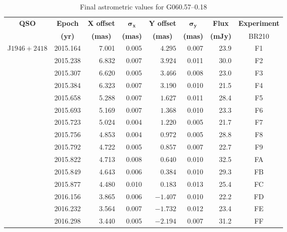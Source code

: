 	\begin{table}[h]
		\onehalfspacing
		\footnotesize
		\centering
		\caption{Final astrometric values for G060.57--0.18}
		\label{tab:g060_position}
		\begin{tabular}{lrrrrrrc} \toprule
			\multicolumn{1}{c}{\bf QSO}&\multicolumn{1}{c}{\bf Epoch} & \multicolumn{1}{c}{\bf X offset} & \multicolumn{1}{c}{$\boldsymbol{\sigma_x}$} & \multicolumn{1}{c}{\bf Y offset} & \multicolumn{1}{c}{$\boldsymbol{\sigma_y}$} & \multicolumn{1}{c}{\bf Flux} & \multicolumn{1}{c}{\bf Experiment} \\
			\multicolumn{1}{c}{}&\multicolumn{1}{c}{\bf (yr)} & \multicolumn{1}{c}{\bf (mas)} & \multicolumn{1}{c}{\bf (mas)} & \multicolumn{1}{c}{\bf (mas)} & \multicolumn{1}{c}{\bf (mas)} & \multicolumn{1}{c}{\bf (mJy)} & \multicolumn{1}{c}{BR210} \\ \midrule    
			J$1946+2418$&2015.164 &  7.001 &  0.005    &  $ 4.295$ &  0.007 & 23.9 & F1 \\
						&2015.238 &  6.832   &  0.007  &  $ 3.924$ &  0.011 & 30.0 & F2 \\
						&2015.307 &  6.620   &  0.005  &  $ 3.466$ &  0.008 & 23.0 & F3 \\
						&2015.384 &  6.323   &  0.007  &  $ 3.190$ &  0.010 & 21.5 & F4 \\
						&2015.658 &  5.288   &  0.007  &  $ 1.627$ &  0.011 & 28.4 & F5 \\
						&2015.693 &  5.169   &  0.007  &  $ 1.368$ &  0.010 & 23.3 & F6 \\
						&2015.723 &  5.024   &  0.004  &  $ 1.220$ &  0.005 & 21.7 & F7 \\
						&2015.756 &  4.853   &  0.004  &  $ 0.972$ &  0.005 & 28.8 & F8 \\
						&2015.792 &  4.722   &  0.005  &  $ 0.857$ &  0.007 & 22.7 & F9 \\
						&2015.822 &  4.713   &  0.008  &  $ 0.640$ &  0.010 & 32.5 & FA \\
						&2015.849 &  4.643   &  0.006  &  $ 0.384$ &  0.010 & 29.3 & FB \\
						&2015.877 &  4.480   &  0.010  &  $ 0.183$ &  0.013 & 25.4 & FC \\
						&2016.156 &  3.865   &  0.006  &  $-1.407$ &  0.010 & 22.2 & FD \\
						&2016.232 &  3.564   &  0.007  &  $-1.732$ &  0.012 & 23.4 & FE \\
						&2016.298 &  3.440   &  0.005  &  $-2.194$ &  0.007 & 31.2 & FF \\

\end{tabular}
\end{table}
